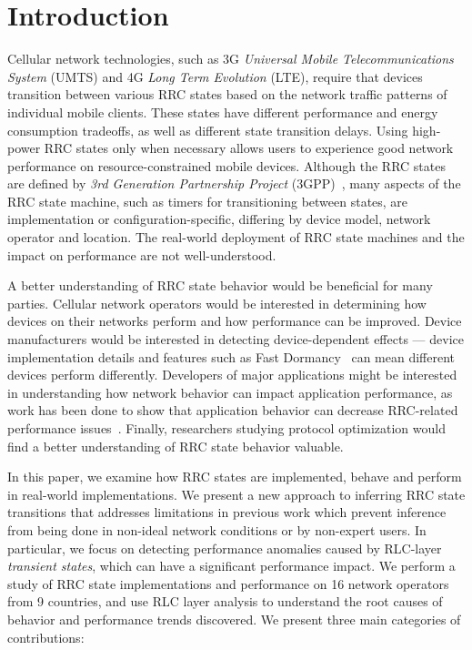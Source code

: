 \section{Introduction}
Cellular network technologies, such as 3G \textit{Universal Mobile Telecommunications System} (UMTS) and 4G \textit{Long Term Evolution} (LTE), require that devices transition between various RRC states based on the network traffic patterns of individual mobile clients.  These states have different performance and energy consumption tradeoffs, as well as different state transition delays.  Using high-power RRC states only when necessary allows users to experience good network performance on resource-constrained mobile devices. Although the RRC states are defined by \textit{3rd Generation Partnership Project} (3GPP)~\cite{spec-3G-RRC, spec-LTE-RRC}, many aspects of the RRC state machine, such as timers for transitioning between states, are implementation or configuration-specific, differing by device model, network operator and location.  The real-world deployment of RRC state machines and the impact on performance are not well-understood. 

A better understanding of RRC state behavior would be beneficial for many parties.  Cellular network operators would be interested in determining how devices on their networks perform and how performance can be improved.  Device manufacturers would be interested in detecting device-dependent effects --- device implementation details and features such as Fast Dormancy~\cite{fast_dormancy} can mean different devices perform differently. Developers of major applications might be interested in understanding how network behavior can impact application performance, as work has been done to show that application behavior can decrease RRC-related performance issues~\cite{aro}.  Finally, researchers studying protocol optimization would find a better understanding of RRC state behavior valuable. 

In this paper, we examine how RRC states are implemented, behave and perform in real-world implementations. We present a new approach to inferring RRC state transitions that addresses limitations in previous work which prevent inference from being done in non-ideal network conditions or by non-expert users. In particular, we focus on detecting performance anomalies caused by RLC-layer \textit{transient states}, which can have a significant performance impact. We perform a study of RRC state implementations and performance on 16 network operators from 9 countries,  and use RLC layer analysis to understand the root causes of behavior and performance trends discovered. We present three main categories of contributions: %


